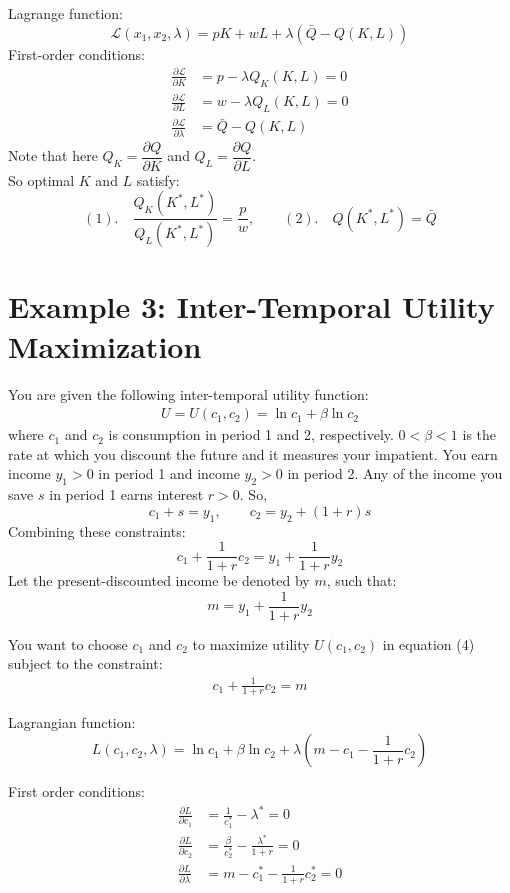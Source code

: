 \documentclass{./../Latex/handout}
\begin{document}
Lagrange function: 
  $$ \mathcal{L}(x_1,x_2,\lambda) =  p K + w L + \lambda(\bar{Q}-Q(K,L))$$
First-order conditions:
\begin{align*}
	\frac{\partial \mathcal{L}}{\partial K} &= p-\lambda Q_K(K,L)=0 \\ 
	 \frac{\partial \mathcal{L}}{\partial L} &= w-\lambda Q_L(K,L) = 0 \\
	  \frac{\partial \mathcal{L}}{\partial \lambda} &= \bar{Q}-Q(K,L)
\end{align*}
Note that here $Q_K = \dfrac{\partial Q}{\partial K}$ and $Q_L = \dfrac{\partial Q}{\partial L}$. \\

So optimal $K$ and $L$ satisfy:
$$ (1). \quad \frac{Q_K(K^*,L^*)}{Q_L(K^*,L^*)} = \frac{p}{w},  \quad \quad (2). \quad Q(K^*,L^*) = \bar{Q}$$ 

\section*{Example 3: Inter-Temporal Utility Maximization}
You are given the following inter-temporal utility function:
\begin{align}
	U = U(c_1, c_2) =  \ln c_1 + \beta \ln c_2
\end{align}
where $c_1$ and $c_2$ is consumption in period 1 and 2, respectively. $0<\beta<1$ is the rate at which you discount the future and it measures your impatient. You earn income $y_1>0$ in period 1 and income $y_2>0$ in period 2. Any of the income you save $s$ in period 1 earns interest $r>0$. So, $$ c_1 + s = y_1, \quad \quad c_2 = y_2 + (1+r) s $$
Combining these constraints:
$$ c_1 + \frac{1}{1+r} c_2 = y_1 + \frac{1}{1+r} y_2 $$
Let the present-discounted income be denoted by $m$, such that:
$$ m = y_1 + \frac{1}{1+r} y_2 $$

\vspace{1em}
You want to choose $c_1$ and $c_2$ to maximize utility $U(c_1, c_2)$ in equation (4) subject to the constraint:
 \begin{align} c_1 + \frac{1}{1+r} c_2 = m \end{align}
 
 Lagrangian function:
$$ L(c_1, c_2, \lambda) = \ln c_1 + \beta \ln c_2 + \lambda\left(m- c_1 - \frac{1}{1+r} c_2 \right) $$

First order conditions:
\begin{align}
		\frac{\partial L}{\partial c_1}&=\frac{1}{c^*_1}-\lambda^*=0 \\
		\frac{\partial L}{\partial c_2}&=\frac{\beta}{c^*_2}-\frac{\lambda^*}{1+r}=0 \\
		\frac{\partial L}{\partial \lambda}&=m- c^*_1 - \frac{1}{1+r} c^*_2=0
	\end{align}
	
\end{document}
